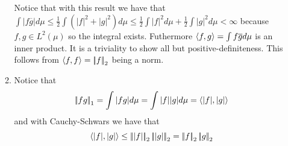 \documentclass[12pt]{amsart}
\begin{document}
\begin{itemize}
\begin{enumerate}
         
         Notice that with this result we have that $\int|f\overline{g}|d\mu\leq\frac{1}{2}\int(|f|^2+|g|^2)d\mu \leq \frac{1}{2}\int|f|^2d\mu +\frac{1}{2}\int|g|^2d\mu <\infty$ 
         because $f,g\in L^2(\mu)$ so the integral exists. Futhermore $\left\langle f,g \right\rangle=\int f\overline{g} d\mu$ is an inner product. It is a triviality to show all but positive-definiteness.
         This follows from $\ip{f,f}=\norm{f}_2$ being a norm.

         \item Notice that 
         \[\norm{fg}_1=\int|fg|d\mu =\int |f||g|d\mu = \ip{|f|,|g|}\]
         and with Cauchy-Schwars we have that
         \[\ip{|f|,|g|}\leq \norm{|f|}_2\norm{|g|}_2=\norm{f}_2\norm{g}_2\]
      \end{enumerate}
\end{itemize}
\end{document}
